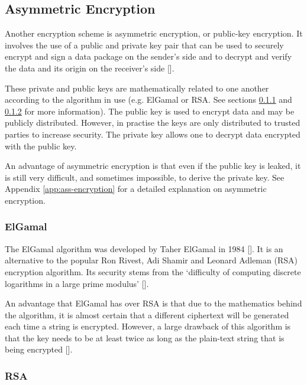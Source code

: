 \subsection{Asymmetric Encryption}
\label{sec:assymetric-encryption}

Another encryption scheme is asymmetric encryption, or public-key
encryption. It involves the use of a public and private key pair that can be
used to securely encrypt and sign a data package on the sender's side and to
decrypt and verify the data and its origin on the receiver's side
[\cite{article:pub-encryption}].

These private and public keys are mathematically related to one another
according to the algorithm in use (e.g. ElGamal or RSA. See sections
\ref{sec:elgamal} and \ref{sec:rsa} for more information). The public key is used to
encrypt data and may be publicly distributed. However, in practise the keys are only
distributed to trusted parties to increase security. The private key allows one to
decrypt data encrypted with the public key. 

An advantage of asymmetric encryption is that
even if the public key is leaked, it is still very difficult, and sometimes impossible,
to derive the private key. See Appendix \ref{app:ass-encryption} for a detailed
explanation on asymmetric encryption.

\subsubsection{ElGamal}
\label{sec:elgamal}

The ElGamal algorithm was developed by Taher ElGamal in 1984 [\cite{journal:elgamal}]. It
is an alternative to the popular Ron Rivest, Adi Shamir and Leonard Adleman
(RSA) encryption algorithm. Its security stems from the `difficulty of
computing discrete logarithms in a large prime modulus' [\cite{website:elgamal}].

An advantage that ElGamal has over RSA is that due to the mathematics behind the
algorithm, it is almost certain that a different ciphertext will be generated each time a
string is encrypted. However, a large drawback of this algorithm is that the key
needs to be at least twice as long as the plain-text string that is being encrypted
[\cite{journal:elgamal}].

\subsubsection{RSA}
\label{sec:rsa}

